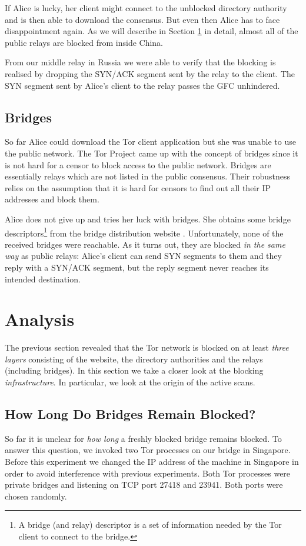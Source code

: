 \documentclass[runningheads,a4paper]{llncs}
\begin{document}
If Alice is lucky, her client might connect to the unblocked directory authority and is then able to
download the consensus. But even then Alice has to face disappointment again. As we will describe
in Section \ref{sec:analysis} in detail, almost all of the public relays are blocked from inside
China.

From our middle relay in Russia we were able to verify that the blocking is realised by dropping the
SYN/ACK segment sent by the relay to the client. The SYN segment sent by Alice's client to the relay
passes the GFC unhindered.

\subsection{Bridges}
So far Alice could download the Tor client application but she was unable to use the public network.
The Tor Project came up with the concept of bridges \cite{Dingledine2006a} since it is not hard for
a censor to block access to the public network. Bridges are essentially relays which are not listed
in the public consensus. Their robustness relies on the assumption that it is hard for censors to
find out all their IP addresses and block them.

Alice does not give up and tries her luck with bridges. She obtains some bridge
descriptors\footnote{A bridge (and relay) descriptor is a set of information needed by the Tor
client to connect to the bridge.} from the bridge distribution website \cite{bridges}.
Unfortunately, none of the received bridges were reachable. As it turns out, they are blocked
\emph{in the same way} as public relays: Alice's client can send SYN segments to them and they reply
with a SYN/ACK segment, but the reply segment never reaches its intended destination.


\section{Analysis}
\label{sec:analysis}
The previous section revealed that the Tor network is blocked on at least \emph{three layers}
consisting of the website, the directory authorities and the relays (including bridges). In this
section we take a closer look at the blocking \emph{infrastructure}. In particular, we look at the
origin of the active scans.

\subsection{How Long Do Bridges Remain Blocked?}
So far it is unclear for \emph{how long} a freshly blocked bridge remains blocked. To answer this
question, we invoked two Tor processes on our bridge in Singapore. Before this experiment we changed
the IP address of the machine in Singapore in order to avoid interference with previous experiments.
Both Tor processes were private bridges and listening on TCP port 27418 and 23941. Both ports were
chosen randomly.
\end{document}

